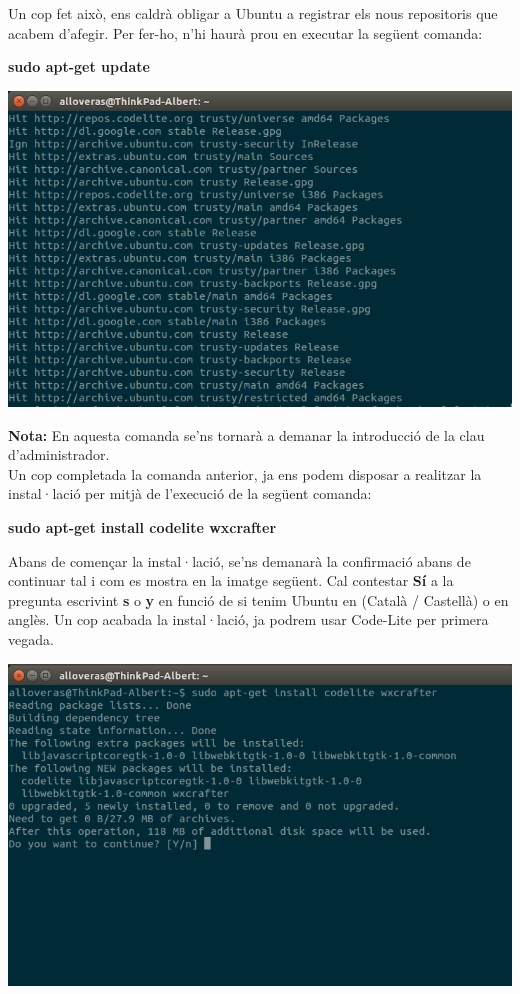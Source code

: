 \documentclass[11pt]{article}
\begin{document}
\pagebreak
\noindent Un cop fet això, ens caldrà obligar a Ubuntu a registrar els nous repositoris que acabem d'afegir. Per fer-ho, n'hi haurà prou en executar la següent comanda:
\begin{center}
	\textbf{sudo apt-get update}
\end{center}

\begin{center}
	\includegraphics[scale=0.4]{img/Apt_Get_Update.png}
\end{center}

\noindent \textbf{Nota:} En aquesta comanda se'ns tornarà a demanar la introducció de la clau d'administrador.\\

\noindent Un cop completada la comanda anterior, ja ens podem disposar a realitzar la instal·lació per mitjà de l'execució de la següent comanda:
\begin{center}
	\textbf{sudo apt-get install codelite wxcrafter}
\end{center}

\noindent Abans de començar la instal·lació, se'ns demanarà la confirmació abans de continuar tal i com es mostra en la imatge següent. Cal contestar \textbf{Sí} a la pregunta escrivint \textbf{s} o \textbf{y} en funció de si tenim Ubuntu en (Català / Castellà) o en anglès. Un cop acabada la instal·lació, ja podrem usar Code-Lite per primera vegada. 

\begin{center}
	\includegraphics[scale=0.4]{img/Apt_Get_Install.png}
\end{center}
\end{document}
